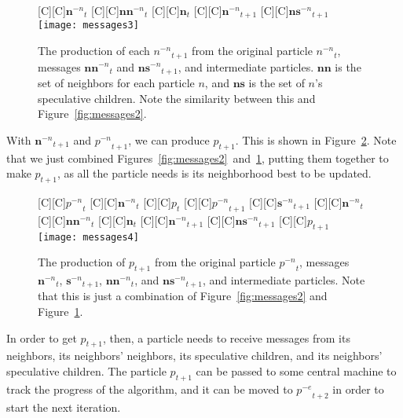 \documentclass[smallcondensed]{svjour3}
\newcommand{\fig}[1]{Figure~\ref{fig:#1}}
\providecommand{\noeval}[1]{\ensuremath{#1^{-e}}}
\providecommand{\nonbest}[1]{\ensuremath{#1^{-n}}}
\providecommand{\p}{\ensuremath{p}}
\providecommand{\sset}{\ensuremath{\mathbf{s}}}
\providecommand{\nsset}{\ensuremath{\mathbf{ns}}}
\providecommand{\n}{\ensuremath{n}}
\providecommand{\nset}{\ensuremath{\mathbf{n}}}
\providecommand{\nnset}{\ensuremath{\mathbf{nn}}}
\begin{document}
\begin{figure}
  \centering
  [C][C]{$\nonbest{\nset}_{t}$}
  [C][C]{$\nonbest{\nnset}_{t}$}
  [C][C]{$\nset_{t}$}
  [C][C]{$\nonbest{\nset}_{t+1}$}
  [C][C]{$\nonbest{\nsset}_{t+1}$}
  \texttt{[image: messages3]}
  \caption{The production of each $\nonbest{\n}_{t+1}$ from the original
  particle $\nonbest{\n}_{t}$, messages $\nonbest{\nnset}_{t}$ and
  $\nonbest{\nsset}_{t+1}$, and intermediate particles.  $\nnset$ is the set of
  neighbors for each particle $\n$, and $\nsset$ is the set of $\n$'s
  speculative children.  Note the similarity between this and \fig{messages2}.}
  \label{fig:messages3}
\end{figure}

With $\nonbest{\nset}_{t+1}$ and $\nonbest{\p}_{t+1}$, we can produce
$\p_{t+1}$.  This is shown in \fig{messages4}.  Note that we just combined
Figures~\ref{fig:messages2}~and~\ref{fig:messages3}, putting them together
to make $\p_{t+1}$, as all the particle needs is its neighborhood best to be
updated.

\begin{figure}
  \centering
  [C][C]{$\nonbest{\p}_{t}$}
  [C][C]{$\nonbest{\nset}_{t}$}
  [C][C]{$\p_{t}$}
  [C][C]{$\nonbest{\p}_{t+1}$}
  [C][C]{$\nonbest{\sset}_{t+1}$}
  [C][C]{$\nonbest{\nset}_{t}$}
  [C][C]{$\nonbest{\nnset}_{t}$}
  [C][C]{$\nset_{t}$}
  [C][C]{$\nonbest{\nset}_{t+1}$}
  [C][C]{$\nonbest{\nsset}_{t+1}$}
  [C][C]{$\p_{t+1}$}
  \texttt{[image: messages4]}
  \caption{The production of $\p_{t+1}$ from the original particle 
  $\nonbest{\p}_{t}$, messages $\nonbest{\nset}_{t}$, $\nonbest{\sset}_{t+1}$,
  $\nonbest{\nnset}_{t}$, and $\nonbest{\nsset}_{t+1}$, and intermediate
  particles.  Note that this is just a combination of \fig{messages2} and
  \fig{messages3}.}
  \label{fig:messages4}
\end{figure}

In order to get $\p_{t+1}$, then, a particle needs to receive messages from its
neighbors, its neighbors' neighbors, its speculative children, and its
neighbors' speculative children.  The particle $\p_{t+1}$ can be passed to some
central machine to track the progress of the algorithm, and it can be moved to
$\noeval{\p}_{t+2}$ in order to start the next iteration.
\end{document}
